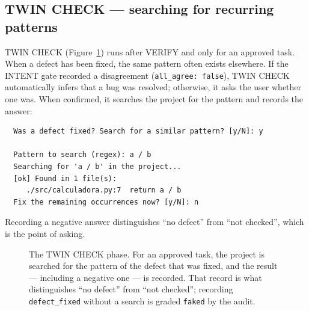 \documentclass{sbc2019}%
\begin{document}
\subsection{TWIN CHECK --- searching for recurring patterns}

TWIN CHECK (Figure~\ref{fig:twin}) runs after VERIFY and only for an
approved task. When a defect has been fixed, the same pattern often exists
elsewhere. If the INTENT gate
recorded a disagreement (\texttt{all\_agree: false}), TWIN CHECK
automatically infers that a bug was resolved; otherwise, it asks the user
whether one was. When confirmed, it searches the project for the pattern
and records the answer:

\begin{lstlisting}
  Was a defect fixed? Search for a similar pattern? [y/N]: y

  Pattern to search (regex): a / b
  Searching for 'a / b' in the project...
  [ok] Found in 1 file(s):
     ./src/calculadora.py:7  return a / b
  Fix the remaining occurrences now? [y/N]: n
\end{lstlisting}

Recording a negative answer distinguishes ``no defect'' from ``not
checked'', which is the point of asking.


\begin{figure}[!ht]
\centering
{}
\caption{The TWIN CHECK phase. For an approved task, the project is
searched for the pattern of the defect that was fixed, and the result ---
including a negative one --- is recorded. That record is what
distinguishes ``no defect'' from ``not checked''; recording
\texttt{defect\_fixed} without a search is graded \texttt{faked} by the
audit.}
\label{fig:twin}
\end{figure}
\end{document}
